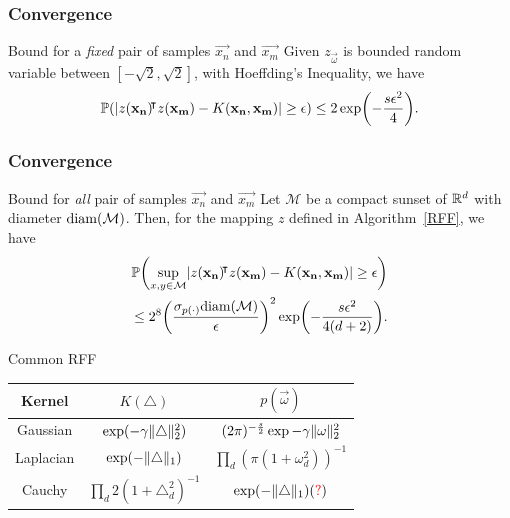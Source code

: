 \documentclass[10pt]{../formats/RU}
\begin{document}
\begin{frame}
  \frametitle{Convergence}
  \begin{exampleblock}{Bound for a \emph{fixed} pair of samples $\vec{x_n}$ and $\vec{x_m}$}
    Given $z_{\vec{\omega}}$ is bounded random variable between $[-\sqrt{2}, \sqrt{2}]$, with Hoeffding's Inequality, we have
    \begin{align*}
      \P{\abs{z(\vec{x_n})\trn z(\vec{x_m})-K(\vec{x_n}, \vec{x_m})}\geq \epsilon} \leq 2\exp\parens*{-\frac{s\epsilon^2}{4}}.
    \end{align*}
  \end{exampleblock}
\end{frame}
\begin{frame}
  \frametitle{Convergence}
  \begin{exampleblock}{Bound for \emph{all} pair of samples $\vec{x_n}$ and $\vec{x_m}$}
    Let $\mathcal{M}$ be a compact sunset of $\mathbb{R}^d$ with diameter $\textnormal{diam}(\mathcal{M})$. Then, for the mapping $z$ defined in Algorithm~\ref{RFF}, we have
    \begin{align*}
      \P{\sup_{x,y\in\mathcal{M}}\abs{z(\vec{x_n})\trn z(\vec{x_m})-K(\vec{x_n}, \vec{x_m})}\geq \epsilon} \\
      \leq 2^8\parens*{\frac{\sigma_{p(\cdot)}\textnormal{diam}(\mathcal{M})}{\epsilon}}^2\exp\parens*{-\frac{s\epsilon^2}{4(d+2)}}.
    \end{align*}
  \end{exampleblock}
\end{frame}
\begin{frame}{Common RFF}
  \centering
  \begin{tabular}{c c c}
    Kernel & $K(\triangle)$ & $p(\vec{\omega})$ \\
    \hline
    Gaussian & $\exp(-\gamma\lVert\triangle\rVert_2^2)$ & $(2\pi)^{-\frac{s}{2}}\exp{-\gamma\lVert\mathbf{\omega}\rVert_2^2}$\\
    Laplacian & $\exp(-\lVert\triangle\rVert_1)$ & $\prod\limits_{d}(\pi(1+\omega_d^2))^{-1}$\\
    Cauchy & $\prod\limits_{d}2(1+\triangle_d^2)^{-1}$ & $\exp(-\lVert\triangle\rVert_1)(\textcolor{red}{\mathord{?}})$
  \end{tabular}
\end{frame}
\end{document}

